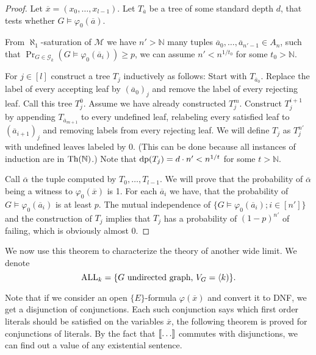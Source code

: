 \begin{proof}
Let $\overline x = (x_0,\dots,x_{l-1})$. Let $T_{\overline a}$ be a tree of some standard depth $d$, that tests whether $G\models\varphi_0(\overline a)$.

From $\aleph_1$-saturation of $\mathcal{M}$ we have $n'>\mathbb{N}$ many tuples \(\overline a_0,\dots,\overline a_{n'-1}\in A_n\), such that \(\Pr_{G\in\mathcal{G}_k}(G\models\varphi_0(\overline a_i))\geq p\), we can assume $n'<n^{1/t_0}$ for some $t_0>\mathbb{N}$.


For $j\in[l]$ construct a tree $T_j$ inductively as follows: Start with $T_{\overline a_0}$. Replace the label of every accepting leaf by $(\overline a_0)_j$ and remove the label of every rejecting leaf. Call this tree $T_j^0$. Assume we have already constructed $T_j^{m}$. Construct $T_j^{i+1}$ by appending $T_{\overline a_{m+1}}$ to every undefined leaf, relabeling every satisfied leaf to $(\overline a_{i+1})_j$ and removing labels from every rejecting leaf. We will define $T_j$ as $T_j^{n'}$ with undefined leaves labeled by $0$. (This can be done because all instances of induction are in $\text{Th}(\mathbb{N})$.) Note that $\text{dp}(T_j)=d\cdot n' < n^{1/t}$ for some $t>\mathbb{N}$. 

Call $\overline \alpha$ the tuple computed by $T_0,\dots,T_{l-1}$. We will prove that the probability of $\overline \alpha$ being a witness to $\varphi_0(\overline x)$ is 1. For each $\overline a_i$ we have, that the probability of $G\models\varphi_0(\overline a_i)$ is at least $p$. The mutual independence of ${\{G\models\varphi_0(\overline a_i);i\in[n']\}}$ and the construction of $T_j$ implies that $T_j$ has a probability of $(1-p)^{n'}$ of failing, which is obviously almost $0$.
\end{proof}

We now use this theorem to characterize the theory of another wide limit. We denote
\[\text{ALL}_k=\{G \text{ undirected graph, }V_G=\langle k)\}.\]

Note that if we consider an open $\{E\}$-formula $\varphi(\overline x)$ and convert it to DNF, we get a disjunction of conjunctions. Each such conjunction says which first order literals should be satisfied on the variables $\overline x$, the following theorem is proved for conjunctions of literals. By the fact that $\llbracket\dots\rrbracket$ commutes with disjunctions, we can find out a value of any existential sentence.

